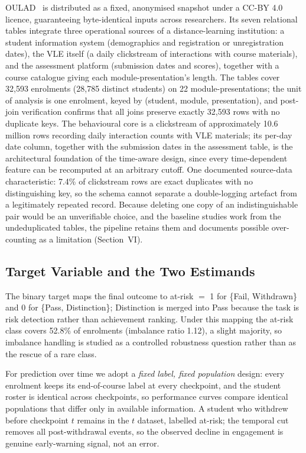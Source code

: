 \documentclass[conference]{IEEEtran}
\begin{document}
OULAD~\cite{kuzilek2017} is distributed as a fixed, anonymised snapshot
under a CC-BY 4.0 licence, guaranteeing byte-identical inputs across
researchers. Its seven relational tables integrate three operational
sources of a distance-learning institution: a student information system
(demographics and registration or unregistration dates), the VLE itself (a
daily clickstream of interactions with course materials), and the
assessment platform (submission dates and scores), together with a course
catalogue giving each module-presentation's length. The tables cover 32,593
enrolments (28,785 distinct students) on 22 module-presentations; the unit
of analysis is one enrolment, keyed by (student, module, presentation), and
post-join verification confirms that all joins preserve exactly 32,593 rows
with no duplicate keys. The behavioural core is a clickstream of
approximately 10.6 million rows recording daily interaction counts with VLE
materials; its per-day date column, together with the submission dates in
the assessment table, is the architectural foundation of the time-aware
design, since every time-dependent feature can be recomputed at an arbitrary
cutoff. One documented source-data characteristic: 7.4\% of clickstream rows
are exact duplicates with no distinguishing key, so the schema cannot
separate a double-logging artefact from a legitimately repeated record.
Because deleting one copy of an indistinguishable pair would be an
unverifiable choice, and the baseline studies work from the undeduplicated
tables, the pipeline retains them and documents possible over-counting as a
limitation (Section~VI).

\subsection{Target Variable and the Two Estimands}

The binary target maps the final outcome to at-risk $=$ 1 for
\{Fail, Withdrawn\} and 0 for \{Pass, Distinction\}; Distinction is merged
into Pass because the task is risk detection rather than achievement
ranking. Under this mapping the at-risk class covers 52.8\% of enrolments
(imbalance ratio 1.12), a slight majority, so imbalance handling is studied
as a controlled robustness question rather than as the rescue of a rare
class.

For prediction over time we adopt a \emph{fixed label, fixed population}
design: every enrolment keeps its end-of-course label at every checkpoint,
and the student roster is identical across checkpoints, so performance
curves compare identical populations that differ only in available
information. A student who withdrew before checkpoint $t$ remains in the
$t$ dataset, labelled at-risk; the temporal cut removes all post-withdrawal
events, so the observed decline in engagement is genuine early-warning
signal, not an error.
\end{document}
